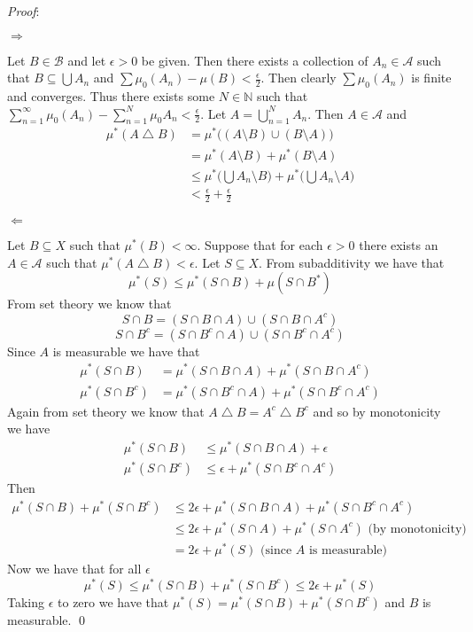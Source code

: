 \documentclass[12pt]{article}
\renewenvironment{proof}{\hspace{-4 ex} \emph{Proof}:}{\qed}
\newcommand{\NN}{\mathbb{N}}
\newcommand{\BB}{\mathcal{B}}
\newcommand{\SA}{\mathcal{A}}
\begin{document}
\begin{proof}
	
	$\Longrightarrow$
	
	Let $B \in \BB$ and let $\epsilon > 0$ be given. Then there exists a collection of $A_n \in \SA$ such that $B \subseteq \bigcup A_n$ and $\sum \mu_0(A_n) - \mu(B) < \tfrac{\epsilon}{2}$. Then clearly $\sum \mu_0(A_n)$ is finite and converges. Thus there exists some $N \in \NN$ such that $\sum\limits_{n=1}^\infty \mu_0(A_n) - \sum\limits_{n=1}^N \mu_0{A_n} < \tfrac{\epsilon}{2}$. Let $A = \bigcup\limits_{n=1}^N A_n$. Then $A \in \SA$ and 
	\begin{align*}
		\mu^*(A \bigtriangleup B) 
		& = \mu^* \big( (A \setminus B) \cup (B \setminus A) \big ) \\
		& = \mu^*(A \setminus B) + \mu^*(B \setminus A) \\
		& \leq  \mu^* \Big( \bigcup A_n \setminus B \Big ) + \mu^* \Big( \bigcup A_n \setminus A \Big ) \\
		& < \tfrac{\epsilon}{2} + \tfrac{\epsilon}{2}
	\end{align*}
	
	$\Longleftarrow$
	
	Let $B \subseteq X$ such that $\mu^*(B) < \infty$. Suppose that for each $\epsilon > 0$ there exists an $A \in \SA$ such that $\mu^*(A \bigtriangleup B) < \epsilon$. Let $S \subseteq X$. From subadditivity we have that 
	$$
	\mu^*(S) \leq \mu^*(S \cap B) + \mu(S \cap B^*)
	$$
	From set theory we know that
	$$
	S \cap B = (S \cap B \cap A) \cup (S \cap B \cap A^c)
	$$$$
	S \cap B^c = (S \cap B^c \cap A) \cup (S \cap B^c \cap A^c)
	$$
	Since $A$ is measurable we have that 
	\begin{align*}
		\mu^*(S \cap B) & = \mu^*(S \cap B \cap A) + \mu^*(S \cap B \cap A^c) \\
		\mu^*(S \cap B^c) & = \mu^*(S \cap B^c \cap A) + \mu^*(S \cap B^c \cap A^c)
	\end{align*}
	Again from set theory we know that $A \bigtriangleup B = A^c \bigtriangleup B^c$ and so by monotonicity we have
	\begin{align*}
		\mu^*(S \cap B) & \leq \mu^*(S \cap B \cap A) + \epsilon \\
		\mu^*(S \cap B^c) & \leq \epsilon + \mu^*(S \cap B^c \cap A^c)
	\end{align*}
	Then
	\begin{align*}
		\mu^*(S \cap B) + \mu^*(S \cap B^c) & \leq 2\epsilon + \mu^*(S \cap B \cap A) + \mu^*(S \cap B^c \cap A^c) \\
		& \leq 2\epsilon + \mu^*(S \cap A) + \mu^*(S \cap A^c) \text{    (by monotonicity)} \\
		& = 2\epsilon + \mu^*(S) \text{ (since $A$ is measurable)}
	\end{align*}
	Now we have that for all $\epsilon$
	$$
	\mu^*(S) \leq \mu^*(S \cap B) + \mu^*(S \cap B^c) \leq 2\epsilon + \mu^*(S)
	$$
	Taking $\epsilon$ to zero we have that $\mu^*(S) = \mu^*(S \cap B) + \mu^*(S \cap B^c)$ and $B$ is measurable.	
\end{proof}
\end{document}
